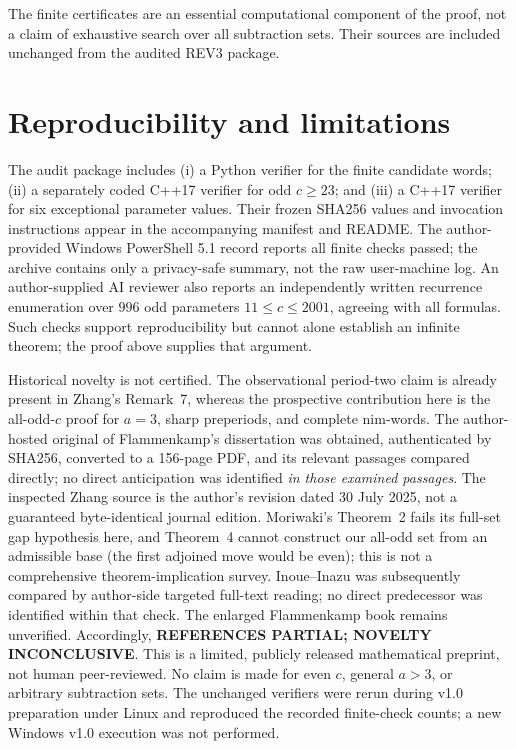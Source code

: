 \documentclass[10pt,a4paper]{article}
\begin{document}
The finite certificates are an essential computational component of the proof, not a claim of exhaustive search over all subtraction sets. Their sources are included unchanged from the audited REV3 package.

\section{Reproducibility and limitations}
The audit package includes (i) a Python verifier for the finite candidate words; (ii) a separately coded C++17 verifier for odd $c\ge23$; and (iii) a C++17 verifier for six exceptional parameter values. Their frozen SHA256 values and invocation instructions appear in the accompanying manifest and README. The author-provided Windows PowerShell 5.1 record reports all finite checks passed; the archive contains only a privacy-safe summary, not the raw user-machine log. An author-supplied AI reviewer also reports an independently written recurrence enumeration over $996$ odd parameters $11\le c\le2001$, agreeing with all formulas. Such checks support reproducibility but cannot alone establish an infinite theorem; the proof above supplies that argument.

Historical novelty is not certified. The observational period-two claim is already present in Zhang's Remark~7, whereas the prospective contribution here is the all-odd-$c$ proof for $a=3$, sharp preperiods, and complete nim-words. The author-hosted original of Flammenkamp's dissertation was obtained, authenticated by SHA256, converted to a 156-page PDF, and its relevant passages compared directly; no direct anticipation was identified \emph{in those examined passages}. The inspected Zhang source is the author's revision dated 30 July 2025, not a guaranteed byte-identical journal edition. Moriwaki's Theorem~2 fails its full-set gap hypothesis here, and Theorem~4 cannot construct our all-odd set from an admissible base (the first adjoined move would be even); this is not a comprehensive theorem-implication survey. Inoue--Inazu was subsequently compared by author-side targeted full-text reading; no direct predecessor was identified within that check. The enlarged Flammenkamp book remains unverified. Accordingly, \textbf{REFERENCES PARTIAL; NOVELTY INCONCLUSIVE}. This is a limited, publicly released mathematical preprint, not human peer-reviewed. No claim is made for even $c$, general $a>3$, or arbitrary subtraction sets. The unchanged verifiers were rerun during v1.0 preparation under Linux and reproduced the recorded finite-check counts; a new Windows v1.0 execution was not performed.
\end{document}
